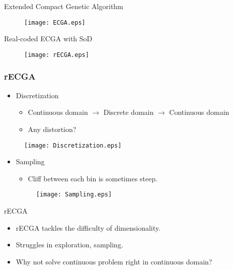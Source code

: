 \begin{frame}{Extended Compact Genetic Algorithm}
  \begin{figure}[t]  
    \texttt{[image: ECGA.eps]}
  \end{figure}
\end{frame}

\begin{frame}{Real-coded ECGA with SoD}
  \begin{figure}[t]  
    \texttt{[image: rECGA.eps]}
  \end{figure}

\end{frame}

\begin{frame}
  \frametitle{rECGA}
  \begin{itemize}
    \item Discretization 
      \begin{itemize}
        \item Continuous domain $\rightarrow$ Discrete domain $\rightarrow$
          Continuous domain
        \item Any distortion?
      \end{itemize}
  \end{itemize}
  \begin{figure}[htpb]
    \texttt{[image: Discretization.eps]}
  \end{figure}
  \begin{itemize}
    \item Sampling
      \begin{itemize}
        \item Cliff between each bin is sometimes steep.
      \end{itemize}
      \begin{figure}[hpb]
        \texttt{[image: Sampling.eps]}
      \end{figure}
  \end{itemize}

\end{frame}


\begin{frame}{rECGA}
  \begin{itemize}
    \item rECGA tackles the difficulty of \alert{dimensionality}.
      \vspace*{14pt}
    \item Struggles in exploration, sampling.
      \vspace*{14pt}
    \item Why not solve continuous problem right in continuous domain?
  \end{itemize}
\end{frame}

